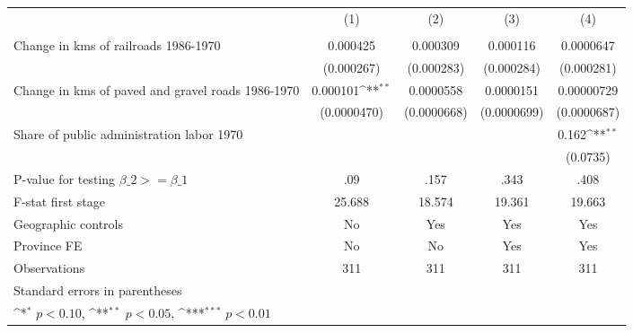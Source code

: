 {
\def\sym#1{\ifmmode^{#1}\else\(^{#1}\)\fi}
\begin{tabular}{l*{4}{c}}
\hline\hline
                &\multicolumn{1}{c}{(1)}&\multicolumn{1}{c}{(2)}&\multicolumn{1}{c}{(3)}&\multicolumn{1}{c}{(4)}\\
                &\multicolumn{1}{c}{}&\multicolumn{1}{c}{}&\multicolumn{1}{c}{}&\multicolumn{1}{c}{}\\
\hline
Change in kms of railroads 1986-1970& 0.000425         & 0.000309         & 0.000116         &0.0000647         \\
                &(0.000267)         &(0.000283)         &(0.000284)         &(0.000281)         \\
[1em]
Change in kms of paved and gravel roads 1986-1970& 0.000101\sym{**} &0.0000558         &0.0000151         &0.00000729         \\
                &(0.0000470)         &(0.0000668)         &(0.0000699)         &(0.0000687)         \\
[1em]
Share of public administration labor 1970&                  &                  &                  &    0.162\sym{**} \\
                &                  &                  &                  & (0.0735)         \\
\hline
P-value for testing $\beta\_{2} >= \beta\_{1}$&      .09         &     .157         &     .343         &     .408         \\
F-stat first stage&   25.688         &   18.574         &   19.361         &   19.663         \\
Geographic controls&       No         &      Yes         &      Yes         &      Yes         \\
Province FE     &       No         &       No         &      Yes         &      Yes         \\
Observations    &      311         &      311         &      311         &      311         \\
\hline\hline
\multicolumn{5}{l}{\footnotesize Standard errors in parentheses}\\
\multicolumn{5}{l}{\footnotesize \sym{*} \(p<0.10\), \sym{**} \(p<0.05\), \sym{***} \(p<0.01\)}\\
\end{tabular}
}
